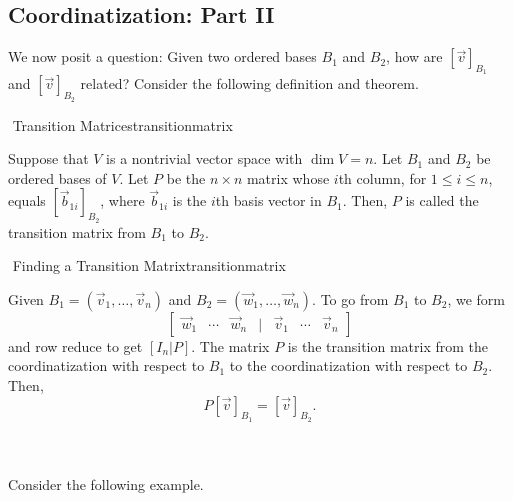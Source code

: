     \subsection{Coordinatization: Part II}
        
        We now posit a question: Given two ordered bases \(B_1\) and \(B_2\), how are \([\vec{v}]_{B_1}\) and \([\vec{v}]_{B_2}\) related? Consider the following definition and theorem.
        \begin{definition}{\Stop\,\,Transition Matrices}{transitionmatrix}

            Suppose that \(V\) is a nontrivial vector space with \(\dim V=n\). Let \(B_1\) and \(B_2\) be ordered bases of \(V\). Let \(P\) be the \(n\times n\) matrix whose \(i\)th column, for \(1\leq i\leq n\), equals \([\vec{b}_{1i}]_{B_2}\), where \(\vec{b}_{1i}\) is the \(i\)th basis vector in \(B_1\). Then, \(P\) is called the transition matrix from \(B_1\) to \(B_2\).
            
        \end{definition}
        \begin{theorem}{\Stop\,\,Finding a Transition Matrix}{transitionmatrix}

            Given \(B_1=(\vec{v}_1,\ldots,\vec{v}_n)\) and \(B_2=(\vec{w}_1,\ldots,\vec{w}_n)\). To go from \(B_1\) to \(B_2\), we form
            \begin{equation*}
                \begin{bmatrix}
                    \vec{w}_1 & \cdots & \vec{w}_n & | & \vec{v}_1 & \cdots & \vec{v}_n
                \end{bmatrix}
            \end{equation*}
            and row reduce to get \([I_n|P]\). The matrix \(P\) is the transition matrix from the coordinatization with respect to \(B_1\) to the coordinatization with respect to \(B_2\). Then,
            \begin{equation*}
                P[\vec{v}]_{B_1}=[\vec{v}]_{B_2}.
            \end{equation*}
            
        \end{theorem}
        \vphantom
        \\
        \\
        Consider the following example.
